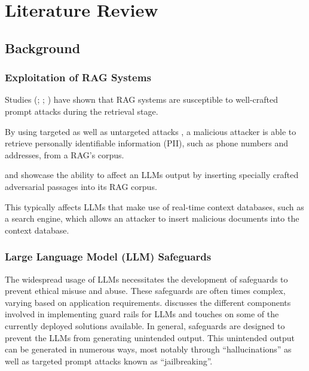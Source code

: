 \chapter{Literature Review} \label {literature}
\section{Background}


\subsection{Exploitation of RAG Systems}
Studies (\cite{tan2024gluepizzaeatrocks}; \cite{zeng2024goodbadexploringprivacy}; \cite{xue2024badragidentifyingvulnerabilitiesretrieval}) have shown that RAG systems are susceptible to well-crafted prompt attacks during the retrieval stage.

By using targeted as well as untargeted attacks \autocite{zeng2024goodbadexploringprivacy}, a malicious attacker is able to retrieve personally identifiable information (PII), such as phone numbers and addresses, from a RAG's corpus.


\autocite{tan2024gluepizzaeatrocks} and \autocite{xue2024badragidentifyingvulnerabilitiesretrieval} showcase the ability to affect an LLMs output by inserting specially crafted adversarial passages into its RAG corpus.

This typically affects LLMs that make use of real-time context databases, such as a search engine, which allows an attacker to insert malicious documents into the context database.

\subsection{Large Language Model (LLM) Safeguards}
The widespread usage of LLMs necessitates the development of safeguards to prevent ethical misuse and abuse.
These safeguards are often times complex, varying based on application requirements.
\autocite{dong2024buildingguardrailslargelanguage} discusses the different components involved in implementing guard rails for LLMs and touches on some of the currently deployed solutions available.
In general, safeguards are designed to prevent the LLMs from generating unintended output.
This unintended output can be generated in numerous ways, most notably through ``hallucinations'' as well as targeted prompt attacks known as ``jailbreaking''.
